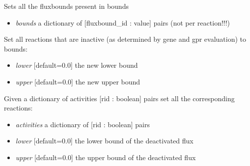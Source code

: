 \documentclass[a4paper,11pt,english]{sphinxmanual}
\begin{document}
\begin{fulllineitems}
\begin{fulllineitems}
Sets all the fluxbounds present in bounds
\begin{itemize}
\item {} 
\emph{bounds} a dictionary of {[}fluxbound\_id : value{]} pairs (not per reaction!!!)

\end{itemize}

\end{fulllineitems}


\begin{fulllineitems}
\label{modules_doc:cbmpy.CBModel.Model.setAllInactiveGPRBounds}
Set all reactions that are inactive (as determined by gene and gpr evaluation) to bounds:
\begin{itemize}
\item {} 
\emph{lower} {[}default=0.0{]} the new lower bound

\item {} 
\emph{upper} {[}default=0.0{]} the new upper bound

\end{itemize}

\end{fulllineitems}


\begin{fulllineitems}
\label{modules_doc:cbmpy.CBModel.Model.setAllProteinActivities}
Given a dictionary of activities {[}rid : boolean{]} pairs set all the corresponding reactions:
\begin{itemize}
\item {} 
\emph{activities} a dictionary of {[}rid : boolean{]} pairs

\item {} 
\emph{lower} {[}default=0.0{]} the lower bound of the deactivated flux

\item {} 
\emph{upper} {[}default=0.0{]} the upper bound of the deactivated flux

\end{itemize}

\end{fulllineitems}


\end{fulllineitems}
\end{document}
